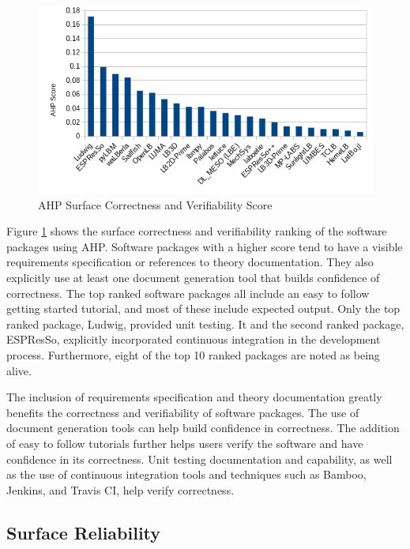 \documentclass[12pt, notitlepage]{article}
\begin{document}
\begin{figure}[h!]
	\begin{center}
		\includegraphics[width=1.0\textwidth]{correctnessverifiability_chart}
		\caption{AHP Surface Correctness and Verifiability Score}
		\label{Fig_CorrectnessVerifiability}
	\end{center}
\end{figure}

Figure \ref{Fig_CorrectnessVerifiability} shows the surface correctness and verifiability ranking of the software packages using AHP. Software packages with a higher score tend to have a visible requirements specification or references to theory documentation. They also explicitly use at least one document generation tool that builds confidence of correctness. The top ranked software packages all include an easy to follow getting started tutorial, and most of these include expected output. Only the top ranked package, Ludwig, provided unit testing. It and the second ranked package, ESPResSo, explicitly incorporated continuous integration in the development process. Furthermore, eight of the top 10 ranked packages are noted as being alive.

The inclusion of requirements specification and theory documentation greatly benefits the correctness and verifiability of software packages. The use of document generation tools can help build confidence in correctness. The addition of easy to follow tutorials further helps users verify the software and have confidence in its correctness. Unit testing documentation and capability, as well as the use of continuous integration tools and techniques such as Bamboo, Jenkins, and Travis CI, help verify correctness.

\subsection{Surface Reliability}
\end{document}

